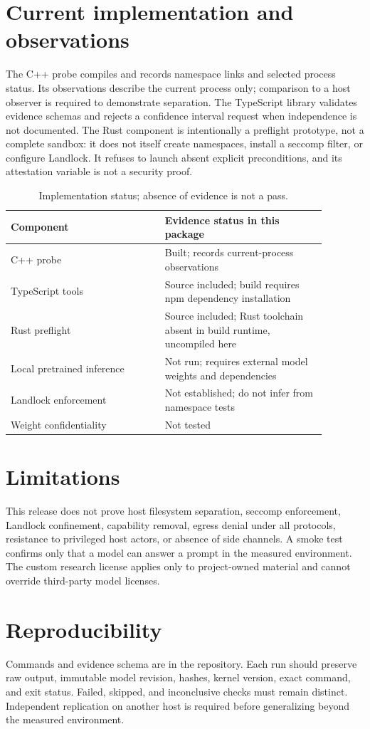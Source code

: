\documentclass[10pt]{article}
\begin{document}
\section{Current implementation and observations}
The C++ probe compiles and records namespace links and selected process status. Its observations describe the current process only; comparison to a host observer is required to demonstrate separation. The TypeScript library validates evidence schemas and rejects a confidence interval request when independence is not documented. The Rust component is intentionally a preflight prototype, not a complete sandbox: it does not itself create namespaces, install a seccomp filter, or configure Landlock. It refuses to launch absent explicit preconditions, and its attestation variable is not a security proof.
\begin{table}[h]\centering\small
\begin{tabular}{p{0.43\linewidth}p{0.45\linewidth}}\toprule
Component & Evidence status in this package \\ \midrule
C++ probe & Built; records current-process observations \\
TypeScript tools & Source included; build requires npm dependency installation \\
Rust preflight & Source included; Rust toolchain absent in build runtime, uncompiled here \\
Local pretrained inference & Not run; requires external model weights and dependencies \\
Landlock enforcement & Not established; do not infer from namespace tests \\
Weight confidentiality & Not tested \\ \bottomrule\end{tabular}
\caption{Implementation status; absence of evidence is not a pass.}\end{table}
\section{Limitations}
This release does not prove host filesystem separation, seccomp enforcement, Landlock confinement, capability removal, egress denial under all protocols, resistance to privileged host actors, or absence of side channels. A smoke test confirms only that a model can answer a prompt in the measured environment. The custom research license applies only to project-owned material and cannot override third-party model licenses.
\section{Reproducibility}
Commands and evidence schema are in the repository. Each run should preserve raw output, immutable model revision, hashes, kernel version, exact command, and exit status. Failed, skipped, and inconclusive checks must remain distinct. Independent replication on another host is required before generalizing beyond the measured environment.
\end{document}
